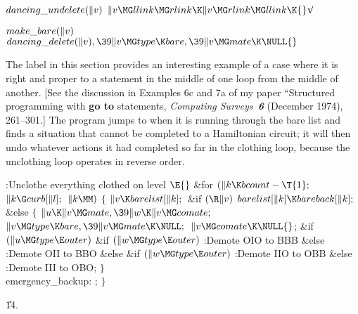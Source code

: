 \Y\B\4\D$\\{dancing\_undelete}(\|v)$ \5
$\|v\MG\\{llink}\MG\\{rlink}\K\|v\MG\\{rlink}\MG\\{llink}\K{}$\|v\par
\B\4\D$\\{make\_bare}(\|v)$ \5
$\\{dancing\_delete}(\|v),\39\|v\MG\\{type}\K\\{bare},\39\|v\MG\\{mate}\K%
\NULL{}$\par
\fi

The  label in this section provides
an interesting example of a case where it is right and proper to
 a statement in the middle of one loop from the middle of another.
[See the discussion in Examples 6c and 7a of my paper ``Structured programming
with {\bf go to} statements, {\sl Computing Surveys\/~\bf6} (December 1974),
261--301.] The program jumps to  when it is running
through the bare list and finds a situation that cannot be completed
to a Hamiltonian circuit; it will then undo whatever actions it had
completed so far in the clothing loop, because the unclothing loop
operates in reverse order.

\Y\B\4:Unclothe everything clothed on level \X${}\E{}$\6
\&{for} ${}(\|k\K\\{bcount}-\T{1};{}$ ${}\|k\G\\{curb}[\|l];{}$ ${}\|k\MM){}$\5
${}\{{}$\1\6
${}\|v\K\\{barelist}[\|k];{}$\6
\&{if} ${}(\R\|v){}$\1\5
${}\\{barelist}[\|k]\K\\{bareback}[\|k];{}$\2\6
\&{else}\5
${}\{{}$\1\6
${}\|u\K\|v\MG\\{mate},\39\|w\K\|v\MG\\{comate};{}$\6
${}\|v\MG\\{type}\K\\{bare},\39\|v\MG\\{mate}\K\NULL;{}$\6
${}\|v\MG\\{comate}\K\NULL{}$;\6
\&{if} ${}(\|u\MG\\{type}\E\\{outer}){}$\1\6
\&{if} ${}(\|w\MG\\{type}\E\\{outer}){}$\1\5
:Demote OIO to BBB\X\2\6
\&{else}\1\5
:Demote OII to BBO\X\2\2\6
\&{else} \&{if} ${}(\|w\MG\\{type}\E\\{outer}){}$\1\5
:Demote IIO to OBB\X\2\6
\&{else}\1\5
:Demote III to OBO\X;\2\6
\4${}\}{}$\2\6
\4\\{emergency\_backup}:\5
;\6
\4${}\}{}$\2\par
\U14.\fi

